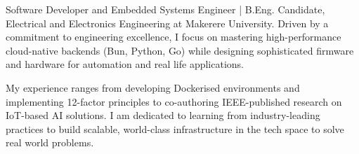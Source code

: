 

\begin{cvparagraph}


Software Developer and Embedded Systems Engineer | B.Eng. Candidate, Electrical and Electronics Engineering at Makerere University. Driven by a commitment to engineering excellence, I focus on mastering high-performance cloud-native backends (Bun, Python, Go) while designing sophisticated firmware and hardware for automation and real life applications.

My experience ranges from developing Dockerised environments and implementing 12-factor principles to co-authoring IEEE-published research on IoT-based AI solutions. I am dedicated to learning from industry-leading practices to build scalable, world-class infrastructure in the tech space to solve real world problems.

\end{cvparagraph}